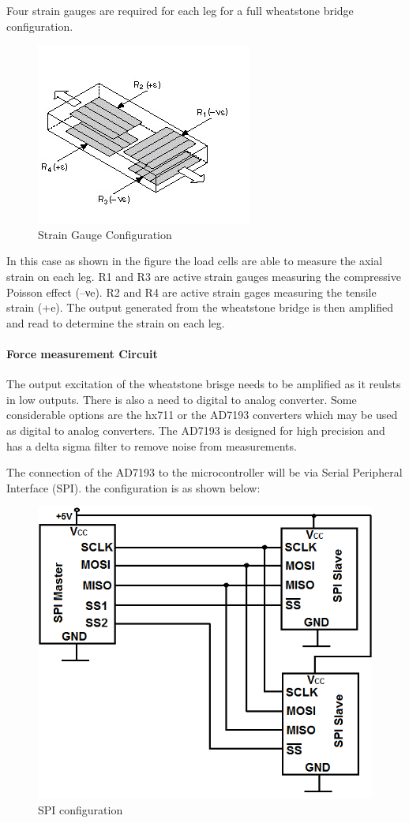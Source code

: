 Four strain gauges are required for each leg for a full wheatstone bridge configuration. 
\begin{center}
	\begin{figure}[!h]
		\centering
		\includegraphics{Figures/loadConf}
		\caption[Strain Gauge Configuration]{Strain Gauge Configuration \cite{noauthor_measuring_nodate}}
	\end{figure}
\end{center}
In this case as shown in the figure the load cells are able to measure the axial strain on each leg. R1 and R3 are active strain gauges measuring the compressive Poisson effect (–νe). R2 and R4 are active strain gages measuring the tensile strain (+e). The output generated from the wheatstone bridge is then amplified and read to determine the strain on each leg.

\paragraph{Force measurement Circuit}
The output excitation of the wheatstone brisge needs to be amplified as it reulsts in low outputs. There is also a need to digital to analog converter. Some considerable options are the hx711 or the AD7193 converters which may be used as digital to analog converters. The AD7193 is designed for high precision and has a delta sigma filter to remove noise from measurements. 

The connection of the AD7193 to the microcontroller will be via Serial Peripheral Interface (SPI). the configuration is as shown below:
\begin{center}
\begin{figure}
\centering
\includegraphics[width=0.55\linewidth]{Figures/SPI}
\caption[SPI configuration]{SPI configuration}
\end{figure}
\end{center}

